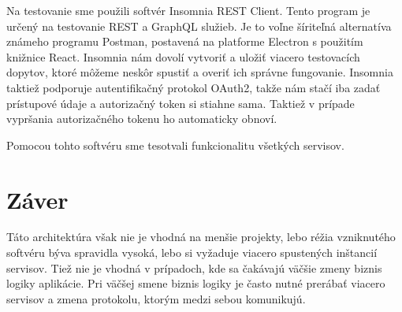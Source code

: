  Na testovanie sme použili softvér Insomnia REST Client\cite{insomnia}. Tento program je určený na testovanie REST a GraphQL služieb. Je to voľne šíriteľná alternatíva známeho programu Postman, postavená na platforme Electron s použitím knižnice React. Insomnia nám dovolí vytvoriť a uložiť viacero testovacích dopytov, ktoré môžeme neskôr spustiť a overiť ich správne fungovanie. Insomnia taktiež podporuje autentifikačný protokol OAuth2, takže nám stačí iba zadať prístupové údaje a autorizačný token si stiahne sama. Taktiež v prípade vypršania autorizačného tokenu ho automaticky obnoví. 
 
 Pomocou tohto softvéru sme tesotvali funkcionalitu všetkých servisov.

\section{Záver}

Táto architektúra však nie je vhodná na menšie projekty, lebo réžia vzniknutého softvéru býva spravidla vysoká, lebo si vyžaduje viacero spustených inštancií servisov. Tiež nie je vhodná v prípadoch, kde sa čakávajú väčšie zmeny biznis logiky aplikácie. Pri väčšej smene biznis logiky je často nutné prerábať viacero servisov a zmena protokolu, ktorým medzi sebou komunikujú.   
